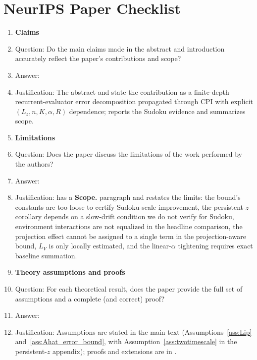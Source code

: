 \documentclass{article}
\theoremstyle{plain}
\theoremstyle{definition}
\theoremstyle{remark}
\begin{document}
\section*{NeurIPS Paper Checklist}
\small
\begin{enumerate}[leftmargin=*,itemsep=0.35em,topsep=0.35em]

\item {\bf Claims}
    \item[] Question: Do the main claims made in the abstract and introduction accurately reflect the paper's contributions and scope?
    \item[] Answer: \answerYes{}
    \item[] Justification: The abstract and  state the contribution as a finite-depth recurrent-evaluator error decomposition propagated through CPI with explicit $(L_z,n,K,\alpha,R)$ dependence;  reports the Sudoku evidence and  summarizes scope.

\item {\bf Limitations}
    \item[] Question: Does the paper discuss the limitations of the work performed by the authors?
    \item[] Answer: \answerYes{}
    \item[] Justification:  has a \textbf{Scope.} paragraph and  restates the limits: the bound's constants are too loose to certify Sudoku-scale improvement, the persistent-$z$ corollary depends on a slow-drift condition we do not verify for Sudoku, environment interactions are not equalized in the headline comparison, the projection effect cannot be assigned to a single term in the projection-aware bound, $L_V$ is only locally estimated, and the linear-$\alpha$ tightening requires exact baseline summation.

\item {\bf Theory assumptions and proofs}
    \item[] Question: For each theoretical result, does the paper provide the full set of assumptions and a complete (and correct) proof?
    \item[] Answer: \answerYes{}
    \item[] Justification: Assumptions are stated in the main text (Assumptions~\ref{ass:Lip} and~\ref{ass:Ahat_error_bound}, with Assumption~\ref{ass:twotimescale} in the persistent-$z$ appendix); proofs and extensions are in .


\end{enumerate}
\end{document}
